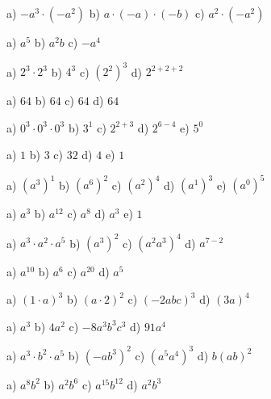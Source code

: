 \begin{tehtava}
a) $-a^3\cdot(-a^2)$ \qquad b) $a\cdot(-a)\cdot(-b)$ \qquad c) $a^2\cdot(-a^2)$
\begin{vastaus}
a) $a^5$ \qquad b) $a^2b$ \qquad c) $-a^4$
\end{vastaus}
\end{tehtava}
\begin{tehtava}
a) $2^3\cdot2^3$ \qquad b) $4^3$ \qquad c) $(2^2)^3$ \qquad d) $2^{2+2+2}$
\begin{vastaus}
a) $64$ \qquad b) $64$ \qquad c) $64$ \qquad d) $64$
\end{vastaus}
\end{tehtava}
\begin{tehtava}
a) $0^3\cdot0^3\cdot0^3$ \qquad b) $3^1$ \qquad c) $2^{2+3}$ \qquad d) $2^{6-4}$ \qquad e) $5^0$
\begin{vastaus}
a) $1$ \qquad b) $3$ \qquad c) $32$ \qquad d) $4$ \qquad e) $1$
\end{vastaus}
\end{tehtava}
\begin{tehtava}
a) $(a^3)^1$ \qquad b) $(a^6)^2$ \qquad c) $(a^2)^4$ \qquad d) $(a^1)^3$ \qquad e) $(a^0)^5$
\begin{vastaus}
a) $a^3$ \qquad b) $a^{12}$ \qquad c) $a^8$ \qquad d) $a^3$ \qquad e) $1$
\end{vastaus}
\end{tehtava}
\begin{tehtava}
a) $a^3\cdot a^2\cdot a^5$ \qquad b) $(a^3)^2$ \qquad c) $(a^2a^3)^4$ \qquad d) $a^{7-2}$
\begin{vastaus}
a) $a^{10}$ \qquad b) $a^6$ \qquad c) $a^{20}$ \qquad d) $a^5$
\end{vastaus}
\end{tehtava}
\begin{tehtava}
a) $(1\cdot a)^3$ \qquad b) $(a\cdot 2)^2$ \qquad c) $(-2abc)^3$ \qquad d) $(3a)^4$
\begin{vastaus}
a) $a^3$ \qquad b) $4a^2$ \qquad c) $-8a^3b^3c^3$ \qquad d) $91a^4$
\end{vastaus}
\end{tehtava}
\begin{tehtava}
a) $a^3\cdot b^2\cdot a^5$ \qquad b) $(-ab^3)^2$ \qquad c) $(a^5a^4)^3$ \qquad d) $b(ab)^2$
\begin{vastaus}
a) $a^8b^2$ \qquad b) $a^2b^6$ \qquad c) $a^{15}b^{12}$ \qquad d) $a^2b^3$
\end{vastaus}
\end{tehtava}
